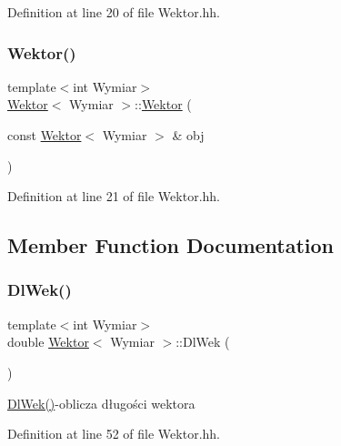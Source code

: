 Definition at line 20 of file Wektor.\+hh.

\mbox{\label{class_wektor_a59c95ec1db1b090e29c5cd867953929a}} 
\subsubsection{\texorpdfstring{Wektor()}{Wektor()}\hspace{0.1cm}{\footnotesize\ttfamily [2/2]}}
{\footnotesize\ttfamily template$<$int Wymiar$>$ \\
\hyperlink{class_wektor}{Wektor}$<$ Wymiar $>$\+::\hyperlink{class_wektor}{Wektor} (\begin{DoxyParamCaption}\item[{const \hyperlink{class_wektor}{Wektor}$<$ Wymiar $>$ \&}]{obj }\end{DoxyParamCaption})\hspace{0.3cm}{\ttfamily [inline]}}



Definition at line 21 of file Wektor.\+hh.



\subsection{Member Function Documentation}
\mbox{\label{class_wektor_a49964f91d93ff53bd4152665fd93e57d}} 
\subsubsection{\texorpdfstring{Dl\+Wek()}{DlWek()}}
{\footnotesize\ttfamily template$<$int Wymiar$>$ \\
double \hyperlink{class_wektor}{Wektor}$<$ Wymiar $>$\+::Dl\+Wek (\begin{DoxyParamCaption}{ }\end{DoxyParamCaption})}

\hyperlink{class_wektor_a49964f91d93ff53bd4152665fd93e57d}{Dl\+Wek()}-\/oblicza długości wektora 

Definition at line 52 of file Wektor.\+hh.

